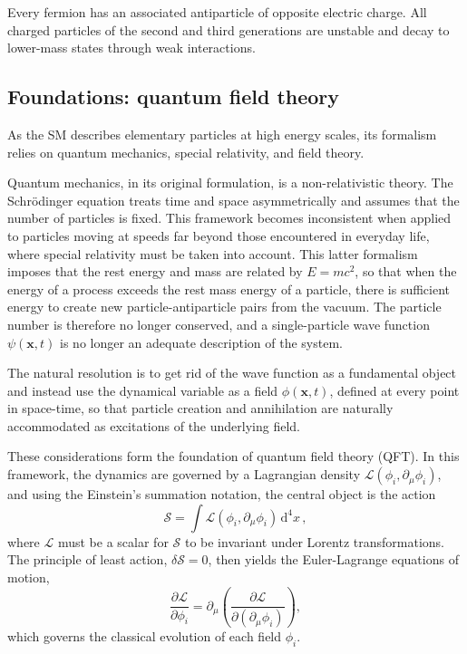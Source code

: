 Every fermion has an associated antiparticle of opposite electric charge. All charged particles of the second and third generations are unstable and decay to lower-mass states through weak interactions.



\subsection{Foundations: quantum field theory}

As the SM describes elementary particles at high energy scales, its formalism relies on quantum mechanics, special relativity, and field theory. 

Quantum mechanics, in its original formulation, is a non-relativistic theory. The Schrödinger equation treats time and space asymmetrically and assumes that the number of particles is fixed. This framework becomes inconsistent when applied to particles moving at speeds far beyond those encountered in everyday life, where special relativity must be taken into account. This latter formalism imposes that the rest energy and mass are related by $E=mc^2$, so that when the energy of a process exceeds the rest mass energy of a particle, there is sufficient energy to create new particle-antiparticle pairs from the vacuum. The particle number is therefore no longer conserved, and a single-particle wave function $\psi(\mathbf{x},t)$ is no longer an adequate description of the system.

The natural resolution is to get rid of the wave function as a fundamental object and instead use the dynamical variable as a field $\phi(\mathbf{x},t)$, defined at every point in space-time, so that particle creation and annihilation are naturally accommodated as excitations of the underlying field.

\vspace{0.5 cm}

These considerations form the foundation of quantum field theory (QFT). In this framework, the dynamics are governed by a Lagrangian density $\mathcal{L}(\phi_i, \partial_\mu \phi_i)$, and using the Einstein’s summation notation, the central object is the action
\begin{equation}
    \mathcal{S} = \int \mathcal{L}\left( \phi_i, \partial_\mu \phi_i \right) \, \mathrm{d}^4x \,,
\end{equation}
where $\mathcal{L}$ must be a scalar for $\mathcal{S}$ to be invariant under Lorentz transformations. The principle of least action, $\delta \mathcal{S} = 0$, then yields the Euler-Lagrange equations of motion,
\begin{equation}
    \frac{\partial \mathcal{L}}{\partial \phi_i} = \partial_\mu \left( \frac{\partial \mathcal{L}}{\partial \left(\partial_\mu \phi_i\right)} \right),
\end{equation}
which governs the classical evolution of each field $\phi_i$. 

